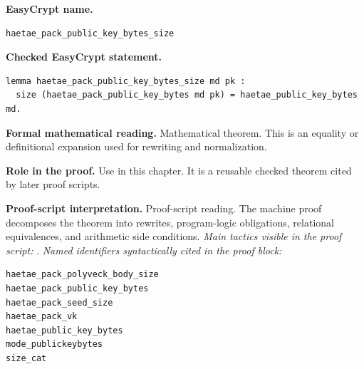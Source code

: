 \begin{formaltheorem}
\noindent\textbf{EasyCrypt name.}
\begin{lstlisting}[language=EasyCrypt,basicstyle=\ttfamily\scriptsize]
haetae_pack_public_key_bytes_size
\end{lstlisting}
\noindent\textbf{Checked EasyCrypt statement.}
\begin{lstlisting}[language=EasyCrypt,basicstyle=\ttfamily\scriptsize]
lemma haetae_pack_public_key_bytes_size md pk :
  size (haetae_pack_public_key_bytes md pk) = haetae_public_key_bytes md.
\end{lstlisting}
\noindent\textbf{Formal mathematical reading.}
Mathematical theorem. This is an equality or definitional expansion used for rewriting and normalization.

\noindent\textbf{Role in the proof.}
Use in this chapter. It is a reusable checked theorem cited by later proof scripts.

\noindent\textbf{Proof-script interpretation.}
Proof-script reading. The machine proof decomposes the theorem into rewrites, program-logic obligations, relational equivalences, and arithmetic side conditions.
\emph{Main tactics visible in the proof script:} .
\emph{Named identifiers syntactically cited in the proof block:}
\begin{lstlisting}[language=EasyCrypt,basicstyle=\ttfamily\scriptsize]
haetae_pack_polyveck_body_size
haetae_pack_public_key_bytes
haetae_pack_seed_size
haetae_pack_vk
haetae_public_key_bytes
mode_publickeybytes
size_cat
\end{lstlisting}

\end{formaltheorem}

